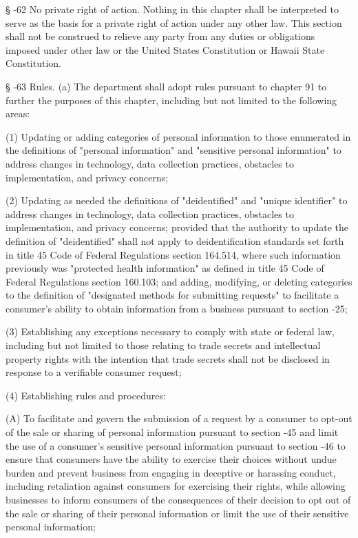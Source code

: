      §   -62  No private right of action.  Nothing in this chapter shall be interpreted to serve as the basis for a private right of action under any other law.  This section shall not be construed to relieve any party from any duties or obligations imposed under other law or the United States Constitution or Hawaii State Constitution.

     §   -63  Rules.  (a)  The department shall adopt rules pursuant to chapter 91 to further the purposes of this chapter, including but not limited to the following areas:

     (1)  Updating or adding categories of personal information to those enumerated in the definitions of "personal information" and "sensitive personal information" to address changes in technology, data collection practices, obstacles to implementation, and privacy concerns;

     (2)  Updating as needed the definitions of "deidentified" and "unique identifier" to address changes in technology, data collection practices, obstacles to implementation, and privacy concerns; provided that the authority to update the definition of "deidentified" shall not apply to deidentification standards set forth in title 45 Code of Federal Regulations section 164.514, where such information previously was "protected health information" as defined in title 45 Code of Federal Regulations section 160.103; and adding, modifying, or deleting categories to the definition of "designated methods for submitting requests" to facilitate a consumer's ability to obtain information from a business pursuant to section    -25;

     (3)  Establishing any exceptions necessary to comply with state or federal law, including but not limited to those relating to trade secrets and intellectual property rights with the intention that trade secrets shall not be disclosed in response to a verifiable consumer request;

     (4)  Establishing rules and procedures:

          (A)  To facilitate and govern the submission of a request by a consumer to opt-out of the sale or sharing of personal information pursuant to section    -45 and limit the use of a consumer's sensitive personal information pursuant to section    -46 to ensure that consumers have the ability to exercise their choices without undue burden and prevent business from engaging in deceptive or harassing conduct, including retaliation against consumers for exercising their rights, while allowing businesses to inform consumers of the consequences of their decision to opt out of the sale or sharing of their personal information or limit the use of their sensitive personal information;

